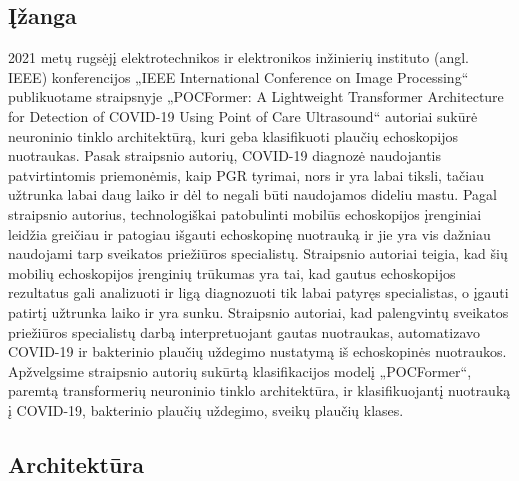\documentclass[fleqn]{VUMIFKompMagistrinis}
\begin{document}
\subsection{Įžanga}
2021 metų rugsėjį elektrotechnikos ir elektronikos inžinierių instituto (angl. IEEE) konferencijos „IEEE International Conference on Image Processing“ publikuotame straipsnyje „POCFormer: A Lightweight Transformer Architecture for Detection of COVID-19 Using Point of Care Ultrasound“ autoriai sukūrė neuroninio tinklo architektūrą, kuri geba klasifikuoti plaučių echoskopijos nuotraukas\cite{PAY21}. Pasak straipsnio autorių, COVID-19 diagnozė naudojantis patvirtintomis priemonėmis, kaip PGR tyrimai, nors ir yra labai tiksli, tačiau užtrunka labai daug laiko ir dėl to negali būti naudojamos dideliu mastu. Pagal straipsnio autorius, technologiškai patobulinti mobilūs echoskopijos įrenginiai leidžia greičiau ir patogiau išgauti echoskopinę nuotrauką ir jie yra vis dažniau naudojami tarp sveikatos priežiūros specialistų. Straipsnio autoriai teigia, kad šių mobilių echoskopijos įrenginių trūkumas yra tai, kad gautus echoskopijos rezultatus gali analizuoti ir ligą diagnozuoti tik labai patyręs specialistas, o įgauti patirtį užtrunka laiko ir yra sunku. Straipsnio autoriai, kad palengvintų sveikatos priežiūros specialistų darbą interpretuojant gautas nuotraukas, automatizavo COVID-19 ir bakterinio plaučių uždegimo nustatymą iš echoskopinės nuotraukos. Apžvelgsime straipsnio autorių sukūrtą klasifikacijos modelį „POCFormer“, paremtą transformerių neuroninio tinklo architektūra, ir klasifikuojantį nuotrauką į COVID-19, bakterinio plaučių uždegimo, sveikų plaučių klases. \cite{PAY21}


\subsection{Architektūra}
\end{document}
